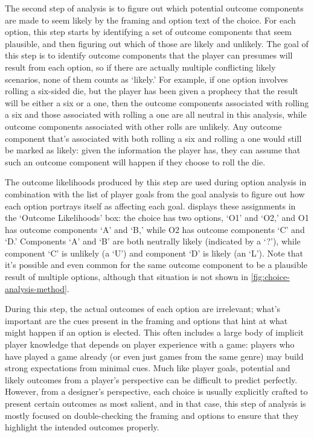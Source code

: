 The second step of analysis is to figure out which potential outcome components are made to seem likely by the framing and option text of the choice.
%
For each option, this step starts by identifying a set of outcome components that seem plausible, and then figuring out which of those are likely and unlikely.
%
The goal of this step is to identify outcome components that the player can presumes will result from each option, so if there are actually multiple conflicting likely scenarios, none of them counts as `likely.'
%
For example, if one option involves rolling a six-sided die, but the player has been given a prophecy that the result will be either a six or a one, then the outcome components associated with rolling a six and those associated with rolling a one are all neutral in this analysis, while outcome components associated with other rolls are unlikely. 
%
Any outcome component that's associated with both rolling a six and rolling a one would still be marked as likely: given the information the player has, they can assume that such an outcome component will happen if they choose to roll the die.


The outcome likelihoods produced by this step are used during option analysis in combination with the list of player goals from the goal analysis to figure out how each option portrays itself as affecting each goal.
%
 displays these assignments in the `Outcome Likelihoods' box: the choice has two options, `O1' and `O2,' and O1 has outcome components `A' and `B,' while O2 has outcome components `C' and `D.'
%
Components `A' and `B' are both neutrally likely (indicated by a `?'), while component `C' is unlikely (a `U') and component `D' is likely (an `L').
%
Note that it's possible and even common for the same outcome component to be a plausible result of multiple options, although that situation is not shown in \cref{fig:choice-analysis-method}.


During this step, the actual outcomes of each option are irrelevant; what's important are the cues present in the framing and options that hint at what might happen if an option is elected.
%
This often includes a large body of implicit player knowledge that depends on player experience with a game: players who have played a game already (or even just games from the same genre) may build strong expectations from minimal cues.
%
Much like player goals, potential and likely outcomes from a player's perspective can be difficult to predict perfectly.
%
However, from a designer's perspective, each choice is usually explicitly crafted to present certain outcomes as most salient, and in that case, this step of analysis is mostly focused on double-checking the framing and options to ensure that they highlight the intended outcomes properly.


